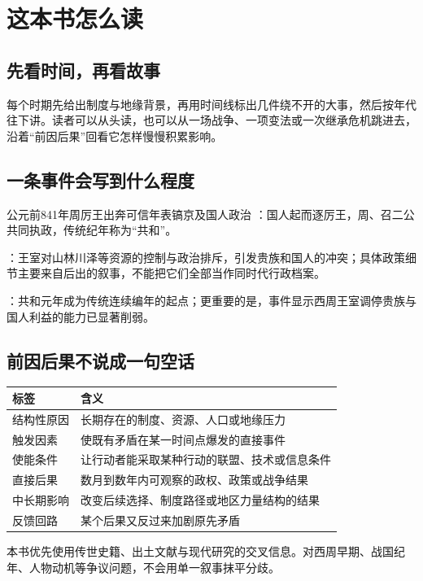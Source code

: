 \chapter{这本书怎么读}

\section{先看时间，再看故事}

每个时期先给出制度与地缘背景，再用时间线标出几件绕不开的大事，然后按年代往下讲。读者可以从头读，也可以从一场战争、一项变法或一次继承危机跳进去，沿着“前因后果”回看它怎样慢慢积累影响。

\section{一条事件会写到什么程度}

\begin{event}{公元前841年}{周厉王出奔}{可信年表}{镐京及国人政治}
：国人起而逐厉王，周、召二公共同执政，传统纪年称为“共和”。

：王室对山林川泽等资源的控制与政治排斥，引发贵族和国人的冲突；具体政策细节主要来自后出的叙事，不能把它们全部当作同时代行政档案。

：共和元年成为传统连续编年的起点；更重要的是，事件显示西周王室调停贵族与国人利益的能力已显著削弱。
\end{event}

\section{前因后果不说成一句空话}

\begin{tabularx}{\linewidth}{@{}l X@{}}
\toprule
标签 & 含义 \\
\midrule
结构性原因 & 长期存在的制度、资源、人口或地缘压力 \\
触发因素 & 使既有矛盾在某一时间点爆发的直接事件 \\
使能条件 & 让行动者能采取某种行动的联盟、技术或信息条件 \\
直接后果 & 数月到数年内可观察的政权、政策或战争结果 \\
中长期影响 & 改变后续选择、制度路径或地区力量结构的结果 \\
反馈回路 & 某个后果又反过来加剧原先矛盾 \\
\bottomrule
\end{tabularx}

\begin{sourcenote}
本书优先使用传世史籍、出土文献与现代研究的交叉信息。对西周早期、战国纪年、人物动机等争议问题，不会用单一叙事抹平分歧。
\end{sourcenote}
